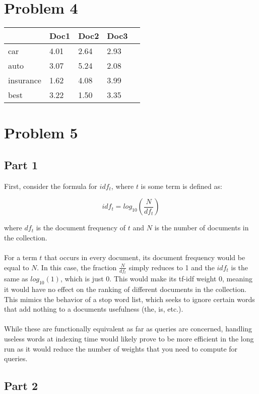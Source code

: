 \documentclass{article}%
\begin{document}
\section*{Problem 4}

\begin{tabular}{| l | l | l | l | l |}
    \hline
                & Doc1  & Doc2  & Doc3  \\ \hline
    car         & 4.01  & 2.64  & 2.93  \\ \hline
    auto        & 3.07  & 5.24  & 2.08  \\ \hline
    insurance   & 1.62  & 4.08  & 3.99  \\ \hline
    best        & 3.22  & 1.50  & 3.35  \\ \hline
\end{tabular}

\section*{Problem 5}

\subsection*{Part 1}

First, consider the formula for $idf_t$, where $t$ is some term is defined as:

$$idf_t = log_{10}\left(\frac{N}{df_t}\right)$$

\noindent where $df_t$ is the document frequency of $t$ and $N$ is the number of documents in the collection.\\
\\
For a term $t$ that occurs in every document, its document frequency would be equal to $N$. In this case, the fraction $\frac{N}{df_t}$ simply reduces to 1 and the $idf_t$ is the same as $log_{10}(1)$, which is just 0. This would make its tf-idf weight 0, meaning it would have no effect on the ranking of different documents in the collection. This mimics the behavior of a stop word list, which seeks to ignore certain words that add nothing to a documents usefulness (the, is, etc.).\\
\\
While these are functionally equivalent as far as queries are concerned, handling useless words at indexing time would likely prove to be more efficient in the long run as it would reduce the number of weights that you need to compute for queries.

\subsection*{Part 2}
\end{document}
